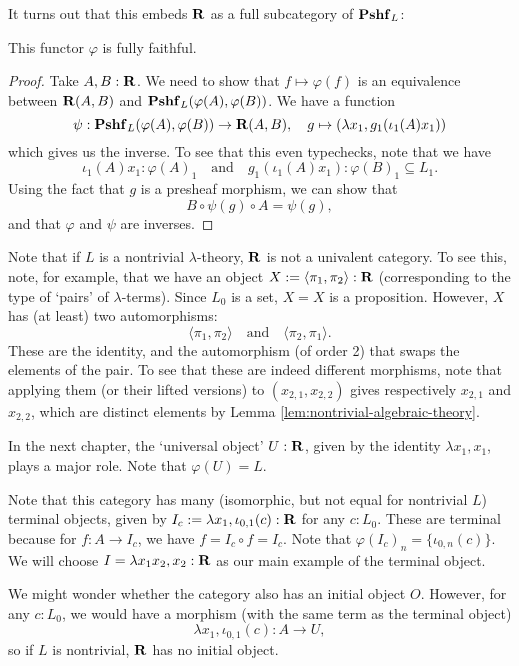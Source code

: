 It turns out that this embeds $ \mathbf{R} $ as a full subcategory of $ \mathbf{Pshf}_{L} $:
\begin{lemma}
  This functor $ \varphi $ is fully faithful.
\end{lemma}
\begin{proof}
  Take $ A, B : \mathbf{R} $. We need to show that $ f \mapsto \varphi(f) $ is an equivalence between $ \mathbf{R}(A, B) $ and $ \mathbf{Pshf}_{L}(\varphi(A), \varphi(B)) $. We have a function
  \[ \psi: \mathbf{Pshf}_{L}(\varphi(A), \varphi(B)) \to \mathbf{R}(A, B), \quad g \mapsto (\lambda x_1, g_1(\iota_1(A) x_1)) \]
  which gives us the inverse. To see that this even typechecks, note that we have
  \[ \iota_1(A) x_1 : \varphi(A)_1 \quad \text{and} \quad g_1(\iota_1(A) x_1) : \varphi(B)_1 \subseteq L_1. \]
  Using the fact that $ g $ is a presheaf morphism, we can show that
  \[ B \circ \psi(g) \circ A = \psi(g), \]
  and that $ \varphi $ and $ \psi $ are inverses.
\end{proof}

\begin{remark}
  Note that if $ L $ is a nontrivial $ \lambda $-theory, $ \mathbf{R} $ is not a univalent category. To see this, note, for example, that we have an object $ X := \langle \pi_1, \pi_2 \rangle : \mathbf{R} $ (corresponding to the type of `pairs' of $ \lambda $-terms). Since $ L_0 $ is a set, $ X = X $ is a proposition. However, $ X $ has (at least) two automorphisms:
  \[ \langle \pi_1, \pi_2 \rangle \quad \text{and} \quad \langle \pi_2, \pi_1 \rangle. \]
  These are the identity, and the automorphism (of order 2) that swaps the elements of the pair. To see that these are indeed different morphisms, note that applying them (or their lifted versions) to $ (x_{2, 1}, x_{2, 2}) $ gives respectively $ x_{2, 1} $ and $ x_{2, 2} $, which are distinct elements by Lemma \ref{lem:nontrivial-algebraic-theory}.
\end{remark}

In the next chapter, the `universal object' $ U : \mathbf{R} $, given by the identity $ \lambda x_1, x_1 $, plays a major role. Note that $ \varphi(U) = L $.

Note that this category has many (isomorphic, but not equal for nontrivial $ L $) terminal objects, given by $ I_c := \lambda x_1, \iota_{0, 1}(c) : \mathbf{R} $ for any $ c: L_0 $. These are terminal because for $ f: A \to I_c $, we have $ f = I_c \circ f = I_c $. Note that $ \varphi(I_c)_n = \{ \iota_{0, n}(c) \} $. We will choose $ I = \lambda x_1 x_2, x_2 : \mathbf{R} $ as our main example of the terminal object.

We might wonder whether the category also has an initial object $ O $. However, for any $ c: L_0 $, we would have a morphism (with the same term as the terminal object)
\[ \lambda x_1, \iota_{0, 1}(c) : A \to U, \]
so if $ L $ is nontrivial, $ \mathbf{R} $ has no initial object.

